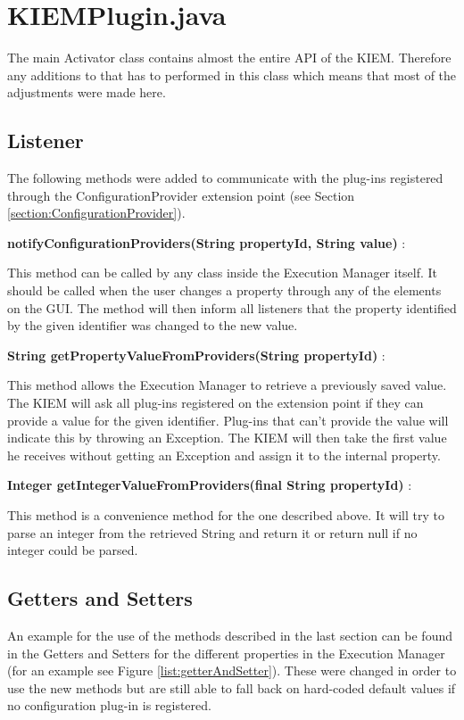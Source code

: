 \section{KIEMPlugin.java}
\label{section:ConfChangesKiemPlugin}
The main Activator class contains almost the entire \ac{API} of the \ac{KIEM}.
Therefore any additions to that has to performed in this class which means that
most of the adjustments were made here.

\subsection{Listener}
The following methods were added to communicate with the plug-ins registered through
the ConfigurationProvider extension point (see Section \ref{section:ConfigurationProvider}).
\begin{description}
 \item \textbf{notifyConfigurationProviders(String propertyId, String value)} : 

This method can be called by any class
inside the Execution Manager itself. It should be called when the user changes a property through any of
the elements on the \ac{GUI}. The method will then inform all listeners that the property identified by the
given identifier was changed to the new value.
 \item \textbf{String getPropertyValueFromProviders(String propertyId)} : 

This method allows the Execution Manager to
retrieve a previously saved value. The \ac{KIEM} will ask all plug-ins registered on the extension point if they
can provide a value for the given identifier. Plug-ins that can't provide the value will indicate this by throwing
an Exception. The \ac{KIEM} will then take the first value he receives without getting an Exception and assign it
to the internal property.
 \item \textbf{Integer getIntegerValueFromProviders(final String propertyId)} : 

This method is a convenience method for
the one described above. It will try to parse an integer from the retrieved String and return it or return null
if no integer could be parsed.
\end{description}

\subsection{Getters and Setters}
An example for the use of the methods described in the last section can be found in the Getters and Setters for
the different properties in the Execution Manager (for an example see Figure \ref{list:getterAndSetter}). 
These were changed in order to use the new methods but are
still able to fall back on hard-coded default values if no configuration plug-in is registered.

